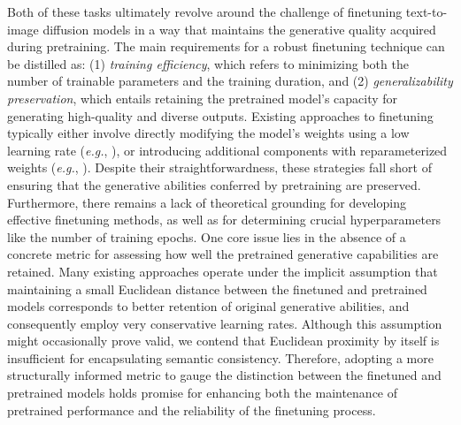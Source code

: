 Both of these tasks ultimately revolve around the challenge of finetuning text-to-image diffusion models in a way that maintains the generative quality acquired during pretraining. The main requirements for a robust finetuning technique can be distilled as: (1) \emph{training efficiency}, which refers to minimizing both the number of trainable parameters and the training duration, and (2) \emph{generalizability preservation}, which entails retaining the pretrained model’s capacity for generating high-quality and diverse outputs. Existing approaches to finetuning typically either involve directly modifying the model's weights using a low learning rate (\emph{e.g.}, \cite{ruiz2023dreambooth}), or introducing additional components with reparameterized weights (\emph{e.g.}, \cite{hulora2022,zhang2023adding}). Despite their straightforwardness, these strategies fall short of ensuring that the generative abilities conferred by pretraining are preserved. Furthermore, there remains a lack of theoretical grounding for developing effective finetuning methods, as well as for determining crucial hyperparameters like the number of training epochs. One core issue lies in the absence of a concrete metric for assessing how well the pretrained generative capabilities are retained. Many existing approaches operate under the implicit assumption that maintaining a small Euclidean distance between the finetuned and pretrained models corresponds to better retention of original generative abilities, and consequently employ very conservative learning rates. Although this assumption might occasionally prove valid, we contend that Euclidean proximity by itself is insufficient for encapsulating semantic consistency. Therefore, adopting a more structurally informed metric to gauge the distinction between the finetuned and pretrained models holds promise for enhancing both the maintenance of pretrained performance and the reliability of the finetuning process.

